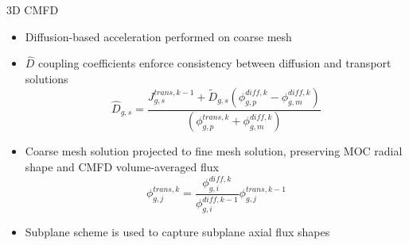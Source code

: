 \begin{frame}[t]{3D CMFD}
    
        \begin{itemize}
          \item Diffusion-based acceleration performed on coarse mesh
          \item $\hat{D}$ coupling coefficients enforce consistency between diffusion and transport solutions
          \begin{equation*}\scriptstyle
          \hat{D}_{g,s} = \frac{J_{g,s}^{trans,k-1} + 
            \tilde{D}_{g,s}\left(\phi_{g,p}^{diff,k} - 
            \phi_{g,m}^{diff,k}\right)}{\left(\phi_{g,p}^{trans,k} + 
            \phi_{g,m}^{diff,k}\right)}
          \end{equation*}
          \item Coarse mesh solution projected to fine mesh solution, preserving MOC radial shape and CMFD volume-averaged flux
          \begin{equation*}\scriptstyle
          \phi_{g,j}^{trans,k} = \frac{\phi_{g,i}^{diff,k}}{\phi_{g,i}^{diff,k-1}} \phi_{g,j}^{trans,k-1}
          \end{equation*}
          \item Subplane scheme is used to capture subplane axial flux shapes
        \end{itemize}
    
\end{frame}



